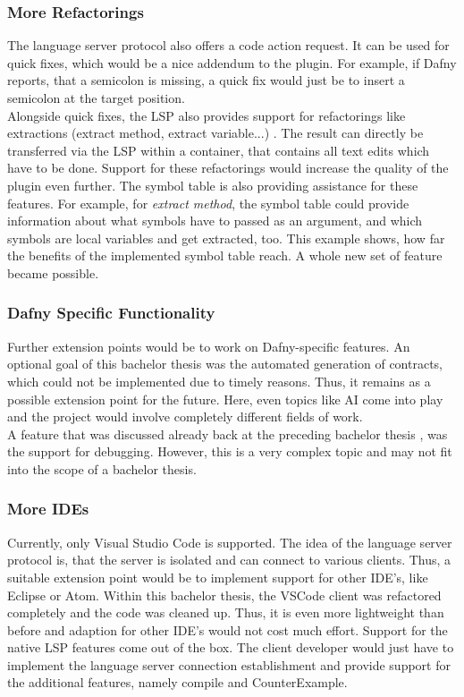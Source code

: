 \subsubsection{More Refactorings}
The language server protocol also offers a code action request.
It can be used for quick fixes, which would be a nice addendum to the plugin.
For example, if Dafny reports, that a semicolon is missing, a quick fix would just be to insert a semicolon at the target position.\\

Alongside quick fixes, the LSP also provides support for refactorings like extractions (extract method, extract variable...) \cite{lspspec}.
The result can directly be transferred via the LSP within a  container, that contains all text edits which have to be done.
Support for these refactorings would increase the quality of the plugin even further.
The symbol table is also providing assistance for these features.
For example, for \textit{extract method}, the symbol table could provide information about what symbols have to passed as an argument, and which symbols are local variables and get extracted, too.
This example shows, how far the benefits of the implemented symbol table reach.
A whole new set of feature became possible.

\subsubsection{Dafny Specific Functionality}
Further extension points would be to work on Dafny-specific features.
An optional goal of this bachelor thesis was the automated generation of contracts, which could not be implemented due to timely reasons.
Thus, it remains as a possible extension point for the future.
Here, even topics like AI come into play and the project would involve completely different fields of work.\\

A feature that was discussed already back at the preceding bachelor thesis \cite{ba}, was the support for debugging.
However, this is a very complex topic and may not fit into the scope of a bachelor thesis.

\subsubsection{More IDEs}
Currently, only Visual Studio Code is supported.
The idea of the language server protocol is, that the server is isolated and can connect to various clients.
Thus, a suitable extension point would be to implement support for other IDE's, like Eclipse or Atom.
Within this bachelor thesis, the VSCode client was refactored completely and the code was cleaned up.
Thus, it is even more lightweight than before and adaption for other IDE's would not cost much effort.
Support for the native LSP features come out of the box.
The client developer would just have to implement the language server connection establishment and provide support for the additional features, namely compile and CounterExample.

